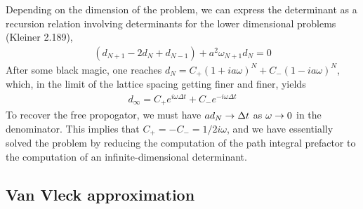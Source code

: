 Depending on the dimension of the problem, we can express the determinant as a recursion relation involving determinants for the lower dimensional problems (Kleiner 2.189),
\begin{align*}
    (d_{N+1}-2d_N+d_{N-1})+a^2\omega_{N+1}d_N=0
\end{align*}
After some black magic, one reaches $d_N=C_+(1+ia\omega)^N+C_-(1-ia\omega)^N$, which, in the limit of the lattice spacing getting finer and finer, yields
\begin{align*}
    d_\infty=C_+ e^{i\omega\Delta t}+ C_{-}e^{-i\omega\Delta t}
\end{align*}
To recover the free propogator, we must have $ad_N\rightarrow\Delta t$ as $\omega\rightarrow 0$ in the denominator.
This implies that $C_+=-C_-=1/2i\omega$, and we have essentially solved the problem by reducing the computation of the path integral prefactor to
the computation of an infinite-dimensional determinant.

\subsection{Van Vleck approximation}
